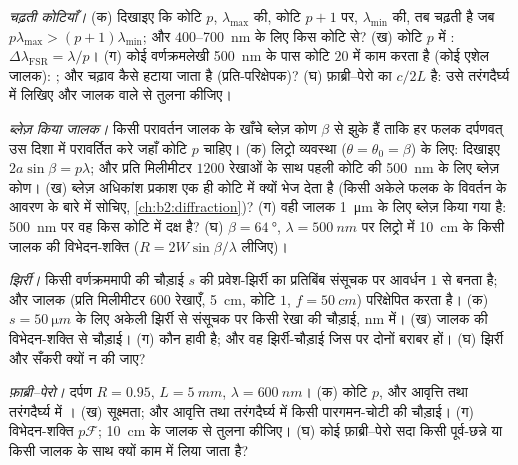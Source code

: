 \begin{exercise}[$\star\star$]\label{exo:b2:gratings:6}
\emph{चढ़ती कोटियाँ।} (क) दिखाइए कि कोटि $p$, $\lambda_{\max}$ की, कोटि $p + 1$ पर,
$\lambda_{\min}$ की, तब चढ़ती है जब $p\lambda_{\max} > (p + 1)\lambda_{\min}$; और $400$--\qty{700}{nm} के लिए
किस कोटि से? (ख) कोटि $p$ में : $\Delta\lambda_{\text{FSR}}
= \lambda/p$। (ग) कोई वर्णक्रमलेखी \qty{500}{nm} के पास कोटि $20$ में काम करता है (कोई
एशेल जालक): ; और चढ़ाव कैसे हटाया जाता है
(प्रति-परिक्षेपक)? (घ) फ़ाब्री--पेरो का  $c/2L$ है:
उसे तरंगदैर्घ्य में लिखिए और जालक वाले से तुलना कीजिए।
\end{exercise}

\begin{exercise}[$\star\star$]\label{exo:b2:gratings:7}
\emph{ब्लेज़ किया जालक।} किसी परावर्तन जालक के खाँचे
ब्लेज़ कोण $\beta$ से झुके हैं ताकि हर फलक दर्पणवत् उस
दिशा में परावर्तित करे जहाँ कोटि $p$ चाहिए। (क) लिट्रो व्यवस्था
($\theta = \theta_0 = \beta$) के लिए: दिखाइए $2a\sin\beta = p\lambda$; और प्रति मिलीमीटर $1200$ रेखाओं के साथ
पहली कोटि की \qty{500}{nm} के लिए ब्लेज़ कोण। (ख) ब्लेज़ अधिकांश
प्रकाश एक ही कोटि में क्यों भेज देता है (किसी अकेले फलक के विवर्तन के आवरण
के बारे में सोचिए, \cref{ch:b2:diffraction})? (ग) वही जालक
\qty{1}{\micro m} के लिए ब्लेज़ किया गया है: \qty{500}{nm} पर वह किस कोटि में दक्ष है? (घ)
$\beta = \qty{64}{\degree}$, $\lambda = \qty{500}{nm}$ पर लिट्रो में \qty{10}{cm} के किसी जालक की
विभेदन-शक्ति ($R = 2W\sin\beta/\lambda$ लीजिए)।
\end{exercise}

\begin{exercise}[$\star\star$]\label{exo:b2:gratings:8}
\emph{झिर्री।} किसी वर्णक्रममापी की चौड़ाई $s$ की प्रवेश-झिर्री का प्रतिबिंब
संसूचक पर आवर्धन $1$ से बनता है; और जालक (प्रति मिलीमीटर $600$ रेखाएँ,
\qty{5}{cm}, कोटि $1$, $f = \qty{50}{cm}$) परिक्षेपित करता है। (क) $s = \qty{50}{\micro m}$ के लिए
अकेली झिर्री से संसूचक पर किसी रेखा की चौड़ाई, nm में। (ख)
जालक की विभेदन-शक्ति से चौड़ाई। (ग) कौन हावी है; और वह झिर्री-चौड़ाई
जिस पर दोनों बराबर हों। (घ) झिर्री और सँकरी क्यों न की जाए?
\end{exercise}

\begin{exercise}[$\star\star$]\label{exo:b2:gratings:9}
\emph{फ़ाब्री--पेरो।} दर्पण $R = 0.95$, $L = \qty{5}{mm}$, $\lambda = \qty{600}{nm}$।
(क) कोटि $p$, और आवृत्ति तथा तरंगदैर्घ्य में । (ख)
सूक्ष्मता; और आवृत्ति तथा तरंगदैर्घ्य में किसी पारगमन-चोटी की चौड़ाई। (ग)
विभेदन-शक्ति $p\mathcal F$; \qty{10}{cm} के जालक से तुलना कीजिए। (घ) कोई फ़ाब्री--पेरो
सदा किसी पूर्व-छन्ने या किसी जालक के साथ क्यों काम में लिया जाता है?
\end{exercise}

